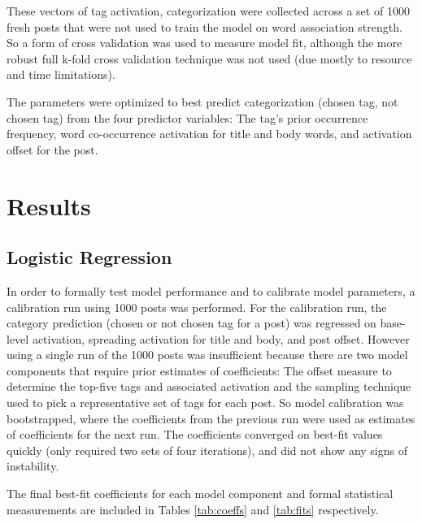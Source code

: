 \documentclass[10pt,letterpaper]{article}
\begin{document}
These vectors of tag activation, categorization were collected across a set of \num{1000} fresh posts that were not used to train the model on word association strength.
So a form of cross validation was used to measure model fit, although the more robust full k-fold cross validation technique was not used (due mostly to resource and time limitations).

The parameters were optimized to best predict categorization (chosen tag, not chosen tag) from the four predictor variables:
The tag's prior occurrence frequency, word co-occurrence activation for title and body words, and activation offset for the post.

\section{Results}

\subsection{Logistic Regression}

In order to formally test model performance and to calibrate model parameters, a calibration run using \num{1000} posts was performed.
For the calibration run, the category prediction (chosen or not chosen tag for a post) was regressed on base-level activation, spreading activation for title and body, and post offset.
However using a single run of the \num{1000} posts was insufficient because there are two model components that require prior estimates of coefficients:
The offset measure to determine the top-five tags and associated activation and the sampling technique used to pick a representative set of tags for each post.
So model calibration was bootstrapped, where the coefficients from the previous run were used as estimates of coefficients for the next run.
The coefficients converged on best-fit values quickly (only required two sets of four iterations), and did not show any signs of instability.

The final best-fit coefficients for each model component and formal statistical measurements are included in Tables \ref{tab:coeffs} and \ref{tab:fits} respectively.
\end{document}
